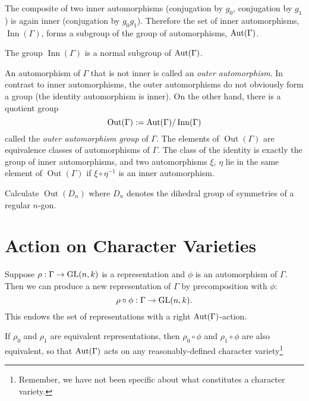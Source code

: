 \documentclass[11pt, oneside, usenames, dvipsnames, svgnames, table, final]{amsart}
\newcommand{\Inn}{\operatorname{Inn}}
\newcommand{\Out}{\operatorname{Out}}
\begin{document}
The composite of two inner automorphisms (conjugation by $g_0$, conjugation by $g_1$) is again inner (conjugation by
$g_0 g_1$). Therefore the set of inner automorphisms, $\Inn(\Gamma)$, forms a subgroup of the group of automorphisms,
$\operatorname{Aut}(\Gamma)$.

\begin{exercise}
  The group $\Inn(\Gamma)$ is a normal subgroup of $\operatorname{Aut}(\Gamma)$.
\end{exercise}


An automorphism of $\Gamma$ that is not inner is called an \emph{outer automorphism}. In contrast to inner
automorphisms, the outer automorphisms do not obviously form a group (the identity automorphism is inner). On the other
hand, there is a quotient group
\[ \Out(\Gamma) : = \Aut(\Gamma)/\Inn(\Gamma) \]
called the \emph{outer automorphism group} of $\Gamma$. The elements of $\Out(\Gamma)$ are equivalence classes of
automorphisms of $\Gamma$. The class of the identity is exactly the group of inner automorphisms, and two automorphisms
$\xi$, $\eta$ lie in the same element of $\Out(\Gamma)$ if $\xi \circ \eta^{-1}$ is an inner automorphism.

\begin{exercise}
  Calculate $\Out(D_n)$ where $D_n$ denotes the dihedral group of symmetries of a regular $n$-gon.
\end{exercise}

\section{Action on Character Varieties}
\label{sec:acti-char-vari}

Suppose $\rho : \Gamma \to \operatorname{GL}(n,k)$ is a representation and $\phi$ is an automorphism of $\Gamma$. Then we can produce
a new representation of $\Gamma$ by precomposition with $\phi$:
\[ \rho \circ \phi : \Gamma \to \operatorname{GL}(n,k). \]
This endows the set of representations with a right $\operatorname{Aut}(\Gamma)$-action.

If $\rho_0$ and $\rho_1$ are equivalent representations, then $\rho_0 \circ \phi$ and $\rho_1 \circ \phi$ are also
equivalent, so that $\operatorname{Aut}(\Gamma)$ acts on any reasonably-defined character variety\footnote{Remember, we have not been
  specific about what constitutes a character variety.}
\end{document}
